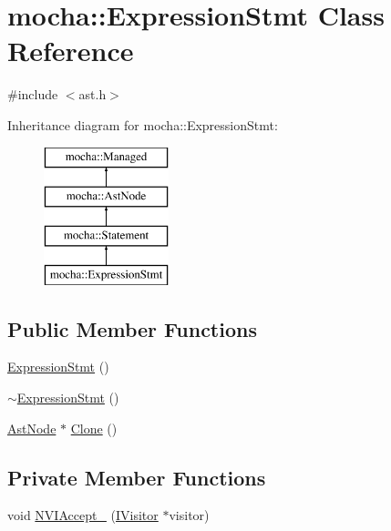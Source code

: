 \hypertarget{classmocha_1_1_expression_stmt}{
\section{mocha::ExpressionStmt Class Reference}
\label{classmocha_1_1_expression_stmt}
}


{\ttfamily \#include $<$ast.h$>$}

Inheritance diagram for mocha::ExpressionStmt:\begin{figure}[H]
\begin{center}
\leavevmode
\includegraphics[height=4.000000cm]{classmocha_1_1_expression_stmt}
\end{center}
\end{figure}
\subsection*{Public Member Functions}
\begin{DoxyCompactItemize}
\item 
\hyperlink{classmocha_1_1_expression_stmt_a3b4754923a4774d81cac0b08848b3bbd}{ExpressionStmt} ()
\item 
\hyperlink{classmocha_1_1_expression_stmt_a6934bdf05bf2237c2db76bd0ce9aa087}{$\sim$ExpressionStmt} ()
\item 
\hyperlink{classmocha_1_1_ast_node}{AstNode} $\ast$ \hyperlink{classmocha_1_1_expression_stmt_a766da5b40c2a6bc68e1947fb52ff8589}{Clone} ()
\end{DoxyCompactItemize}
\subsection*{Private Member Functions}
\begin{DoxyCompactItemize}
\item 
void \hyperlink{classmocha_1_1_expression_stmt_afa89adad8608636cf29a1c2d617347b8}{NVIAccept\_\-} (\hyperlink{classmocha_1_1_i_visitor}{IVisitor} $\ast$visitor)
\end{DoxyCompactItemize}


